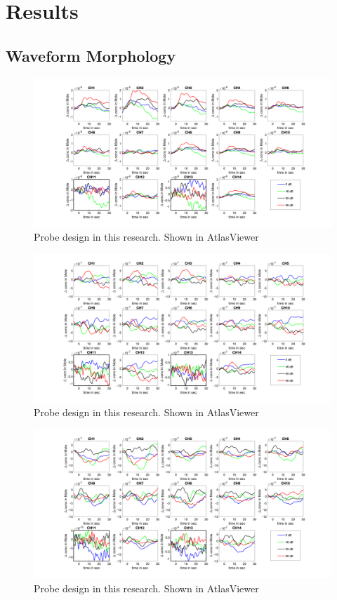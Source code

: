 \chapter{Results}
\section {Waveform Morphology}
\begin{figure}[H]
  \centering
    \includegraphics[scale=.4]{bilder/HbO_Mole/sub_jonas_s_HbO.png}
  \caption{Probe design in this research. Shown in AtlasViewer}
  \label{fig:somesignal}
\end{figure}

\begin{figure}[H]
  \centering
    \includegraphics[scale=.4]{bilder/HbO_Mole/sub_lukas_s_HbO.png}
  \caption{Probe design in this research. Shown in AtlasViewer}
  \label{fig:somesignal}
\end{figure}


\begin{figure}[H]
  \centering
    \includegraphics[scale=.4]{bilder/HbO_Mole/sub_luca2_s_HbO.png}
  \caption{Probe design in this research. Shown in AtlasViewer}
  \label{fig:somesignal}
\end{figure}

